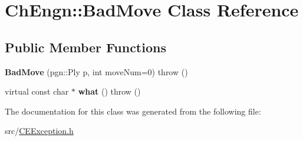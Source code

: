 \hypertarget{classChEngn_1_1BadMove}{
\section{ChEngn::BadMove Class Reference}
\label{classChEngn_1_1BadMove}
}
\subsection*{Public Member Functions}
\begin{DoxyCompactItemize}
\item 
\hypertarget{classChEngn_1_1BadMove_aea2cd3f26b069b801fc4b970b9a984ec}{
{\bfseries BadMove} (pgn::Ply p, int moveNum=0)  throw ()}
\label{classChEngn_1_1BadMove_aea2cd3f26b069b801fc4b970b9a984ec}

\item 
\hypertarget{classChEngn_1_1BadMove_ae7c3114036a9917a5aef4458a8f567d3}{
virtual const char $\ast$ {\bfseries what} ()  throw ()}
\label{classChEngn_1_1BadMove_ae7c3114036a9917a5aef4458a8f567d3}

\end{DoxyCompactItemize}


The documentation for this class was generated from the following file:\begin{DoxyCompactItemize}
\item 
src/\hyperlink{CEException_8h}{CEException.h}\end{DoxyCompactItemize}
